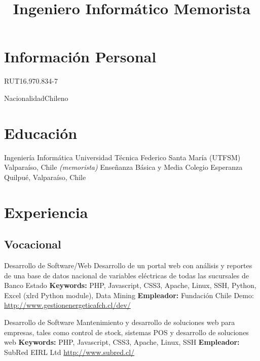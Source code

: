 \documentclass[11pt,a4paper]{moderncv}
\title{Ingeniero Informático Memorista}
\begin{document}
\maketitle

\section{Información Personal}

	   {RUT}{16.970.834-7}

	   {Nacionalidad}{Chileno}
	   
\section{Educación}

        {Ingeniería Informática}
        {Universidad Técnica Federico Santa María (UTFSM)}
        {Valparaíso, Chile}
        {\emph{(memorista)}}
        {}
        {Enseñanza Básica y Media}
        {Colegio Esperanza}
        {Quilpué, Valparaíso, Chile}
        {}{}

\section{Experiencia}
\subsection{Vocacional}
        
        {Desarrollo de Software/Web}
        {Desarrollo de  un portal web con análisis y reportes de una base de datos nacional de variables eléctricas de todas las sucursales de Banco Estado}
        {\textbf{Keywords:} PHP, Javascript, CSS3, Apache, Linux, SSH, Python, Excel (xlrd Python module), Data Mining}
        {\textbf{Empleador:} Fundación Chile}
        {Demo: \url{http://www.gestionenergeticafch.cl/dev/}}

        {Desarrollo de Software}
        {Mantenimiento y desarrollo de soluciones web para empresas, tales como control de stock, sistemas POS y desarrollo de soluciones web}
        {\textbf{Keywords:} PHP, Javascript, CSS3, Apache, Linux, SSH}
        {\textbf{Empleador:} SubRed EIRL Ltd}
        {\url{http://www.subred.cl/}}
\end{document}
